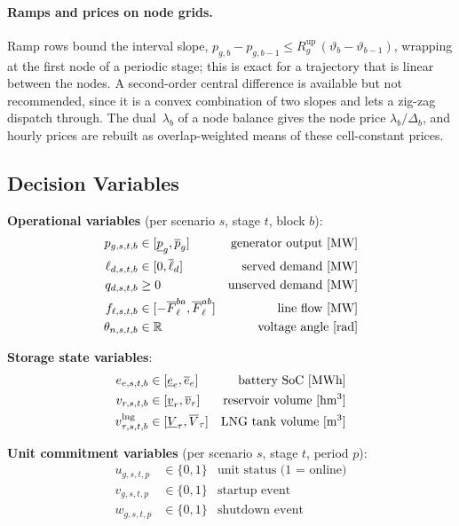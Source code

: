 \paragraph{Ramps and prices on node grids.}
Ramp rows bound the interval slope,
$p_{g,b} - p_{g,b-1} \leq R^\text{up}_g\,(\vartheta_b -
\vartheta_{b-1})$, wrapping at the first node of a periodic stage; this
is exact for a trajectory that is linear between the nodes.  A
second-order central difference is available but not recommended, since
it is a convex combination of two slopes and lets a zig-zag dispatch
through.  The dual~$\lambda_b$ of a node balance gives the node price
$\lambda_b / \Delta_b$, and hourly prices are rebuilt as
overlap-weighted means of these cell-constant prices.

\subsection{Decision Variables}

\noindent\textbf{Operational variables} (per scenario $s$, stage $t$, block $b$):
\begin{align}
  p_{g,s,t,b}  &\in [\underline{p}_g, \overline{p}_g]
    & \text{generator output [MW]} \label{eq:pgen} \\
  \ell_{d,s,t,b} &\in [0, \overline{\ell}_d]
    & \text{served demand [MW]} \label{eq:load} \\
  q_{d,s,t,b}  &\geq 0
    & \text{unserved demand [MW]} \label{eq:fail} \\
  f_{\ell,s,t,b} &\in [-\overline{F}^{ba}_\ell, \overline{F}^{ab}_\ell]
    & \text{line flow [MW]} \label{eq:flow} \\
  \theta_{n,s,t,b} &\in \mathbb{R}
    & \text{voltage angle [rad]} \label{eq:theta}
\end{align}

\noindent\textbf{Storage state variables}:
\begin{align}
  e_{e,s,t,b}  &\in [\underline{e}_e, \overline{e}_e]
    & \text{battery SoC [MWh]} \label{eq:soc} \\
  v_{r,s,t,b}  &\in [\underline{v}_r, \overline{v}_r]
    & \text{reservoir volume [hm\textsuperscript{3}]} \label{eq:vol} \\
  v_{\tau,s,t,b}^{\text{lng}}
               &\in [\underline{V}_\tau, \overline{V}_\tau]
    & \text{LNG tank volume [m\textsuperscript{3}]} \label{eq:lng_vol}
\end{align}

\noindent\textbf{Unit commitment variables} (per scenario $s$, stage $t$, period $p$):
\begin{align}
  u_{g,s,t,p} &\in \{0,1\} & \text{unit status (1 = online)} \\
  v_{g,s,t,p} &\in \{0,1\} & \text{startup event} \\
  w_{g,s,t,p} &\in \{0,1\} & \text{shutdown event}
\end{align}


